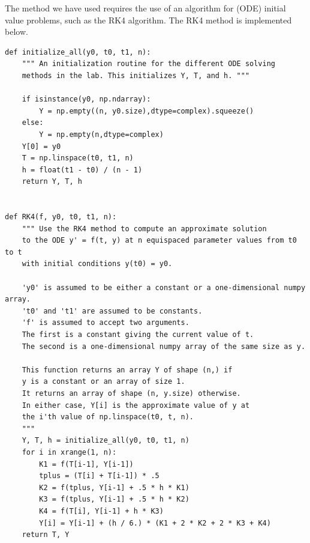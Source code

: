 The method we have used requires the use of an algorithm for (ODE) initial value problems, such as the RK4 algorithm. The RK4 method is implemented below.
\begin{lstlisting}
def initialize_all(y0, t0, t1, n):
	""" An initialization routine for the different ODE solving
	methods in the lab. This initializes Y, T, and h. """
	
	if isinstance(y0, np.ndarray):
		Y = np.empty((n, y0.size),dtype=complex).squeeze()
	else:
		Y = np.empty(n,dtype=complex)
	Y[0] = y0
	T = np.linspace(t0, t1, n)
	h = float(t1 - t0) / (n - 1)
	return Y, T, h


def RK4(f, y0, t0, t1, n):
	""" Use the RK4 method to compute an approximate solution
	to the ODE y' = f(t, y) at n equispaced parameter values from t0 to t
	with initial conditions y(t0) = y0.
	
	'y0' is assumed to be either a constant or a one-dimensional numpy array.
	't0' and 't1' are assumed to be constants.
	'f' is assumed to accept two arguments.
	The first is a constant giving the current value of t.
	The second is a one-dimensional numpy array of the same size as y.
	
	This function returns an array Y of shape (n,) if
	y is a constant or an array of size 1.
	It returns an array of shape (n, y.size) otherwise.
	In either case, Y[i] is the approximate value of y at
	the i'th value of np.linspace(t0, t, n).
	"""
	Y, T, h = initialize_all(y0, t0, t1, n)
	for i in xrange(1, n):
		K1 = f(T[i-1], Y[i-1])
		tplus = (T[i] + T[i-1]) * .5
		K2 = f(tplus, Y[i-1] + .5 * h * K1)
		K3 = f(tplus, Y[i-1] + .5 * h * K2)
		K4 = f(T[i], Y[i-1] + h * K3)
		Y[i] = Y[i-1] + (h / 6.) * (K1 + 2 * K2 + 2 * K3 + K4)
	return T, Y
\end{lstlisting}

